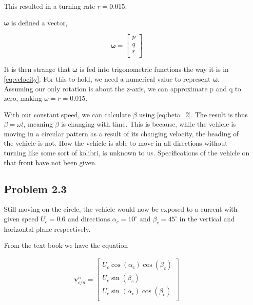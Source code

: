 This resulted in a turning rate $r = 0.015$.

$\boldsymbol{\omega}$ is defined a vector, 

\begin{equation}
    \boldsymbol{\omega} =
    \begin{bmatrix}
        p \\
        q \\
        r \\
    \end{bmatrix}
\end{equation}

It is then strange that $\boldsymbol{\omega}$ is fed into trigonometric functions the way it is in \eqref{eq:velocity}. For this to hold, we need a numerical value to represent $\boldsymbol{\omega}$. Assuming our only rotation is about the z-axis, we can approximate p and q to zero, making $\omega = r = 0.015$.

With our constant speed, we can calculate $\beta$ using \eqref{eq:beta_2}. The result is thus $\beta = \omega t$, meaning $\beta$ is changing with time. This is because, while the vehicle is moving in a circular pattern as a result of its changing velocity, the heading of the vehicle is not. How the vehicle is able to move in all directions without turning like some sort of kolibri, is unknown to us. Specifications of the vehicle on that front have not been given. 

\subsection*{Problem 2.3}

Still moving on the circle, the vehicle would now be exposed to a current with given speed $U_c = 0.6$ and directions $\alpha_c = 10^\circ$ and $\beta_c = 45^\circ$ in the vertical and horizontal plane respectively.

From the text book \cite{Fossen2011} we have the equation

\begin{equation}
    \begin{aligned}
    \mathbf{v}_{c/n}^n 
    =
    \begin{bmatrix}
    U_c \cos(\alpha_c) \cos(\beta_c) \\
    U_c \sin(\beta_c) \\
    U_c \sin(\alpha_c) \cos(\beta_c)\\
    \end{bmatrix}
    \label{eq:v_n_c}
    \end{aligned}
\end{equation}

